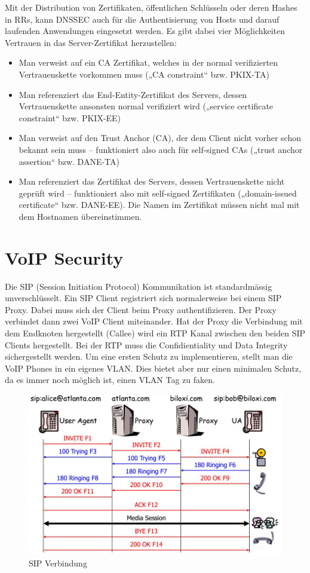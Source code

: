 Mit der Distribution von Zertifikaten, öffentlichen Schlüsseln oder deren Hashes in RRs, kann DNSSEC auch für die Authentisierung von Hosts und darauf laufenden Anwendungen eingesetzt werden. Es gibt dabei vier Möglichkeiten Vertrauen in das Server-Zertifikat herzustellen: 
\begin{itemize}
    \item Man verweist auf ein CA Zertifikat, welches in der normal verifizierten Vertrauenskette vorkommen muss („CA constraint“ bzw. PKIX-TA)
    \item  Man referenziert das End-Entity-Zertifikat des Servers, dessen Vertrauenskette ansonsten normal verifiziert wird („service certificate constraint“ bzw. PKIX-EE)
    \item Man verweist auf den Trust Anchor (CA), der dem Client nicht vorher schon bekannt sein muss – funktioniert also auch für self-signed CAs („trust anchor assertion“ bzw. DANE-TA)
    \item Man referenziert das Zertifikat des Servers, dessen Vertrauenskette nicht geprüft wird – funktioniert also mit self-signed Zertifikaten („domain-issued certificate“ bzw. DANE-EE). Die Namen im Zertifikat müssen nicht mal mit dem Hostnamen übereinstimmen. 
\end{itemize}



\section{VoIP Security}
Die SIP (Session Initiation Protocol) Kommunikation ist standardmässig unverschlüsselt. Ein SIP Client registriert sich normalerweise bei einem SIP Proxy. Dabei muss sich der Client beim Proxy authentifizieren. Der Proxy verbindet dann zwei VoIP Client miteinander. Hat der Proxy die Verbindung mit dem Endknoten hergestellt (Callee) wird ein RTP Kanal zwischen den beiden SIP Clients hergestellt. Bei der RTP muss die Confidientiality und Data Integrity sichergestellt werden. Um eine ersten Schutz zu implementieren, stellt man die VoIP Phones in ein eigenes VLAN. Dies bietet aber nur einen minimalen Schutz, da es immer noch möglich ist, einen VLAN Tag zu faken. 

\begin{figure}[h]
\centering
\includegraphics[width=0.7\linewidth]{images/sip_connection}
\caption{SIP Verbindung}
\label{fig:sipconnection}
\end{figure}

